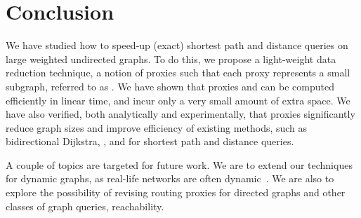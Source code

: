 \section{Conclusion}
\label{sec-con}

We have studied how to speed-up (exact)  shortest path and distance queries on large weighted undirected graphs.
To do this, we  propose  a light-weight data reduction technique, a notion of proxies such that each proxy represents a small subgraph, referred to as \dras. We have shown that
proxies and \dras can be computed efficiently in linear time, and incur only a very small amount of extra space.  We have also verified,
both analytically and experimentally, that proxies significantly reduce graph sizes and improve efficiency of existing methods, such as bidirectional Dijkstra, \arcflag, \tnr and \ah for shortest path and distance queries.

A couple of topics are targeted for future work.
%
We are to extend our techniques for dynamic graphs, as real-life networks are often dynamic~\cite{YuAMW13,fcs-biggraph}.
%
We are also to explore the possibility of revising routing proxies for directed graphs and other classes of graph queries, \eg reachability.
